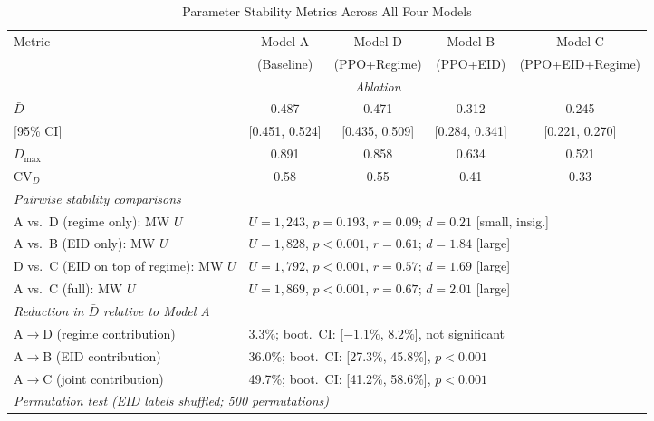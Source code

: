 \documentclass[12pt]{article}
\begin{document}
\begin{table}[t]
\centering
\caption{Parameter Stability Metrics Across All Four Models}
\label{tab:frobenius}
\small
\begin{tabular}{lcccc}
\toprule
Metric & Model A & Model D & Model B & Model C \\
       & (Baseline) & (PPO+Regime) & (PPO+EID) & (PPO+EID+Regime) \\
       & & \textit{Ablation} & & \\
\midrule
$\bar{D}$ & 0.487 & 0.471 & 0.312 & 0.245 \\
\phantom{$\bar{D}$}[95\% CI] & [0.451, 0.524] & [0.435, 0.509] & [0.284, 0.341] & [0.221, 0.270] \\
$D_{\max}$ & 0.891 & 0.858 & 0.634 & 0.521 \\
$\mathrm{CV}_D$ & 0.58 & 0.55 & 0.41 & 0.33 \\
\midrule
\multicolumn{5}{l}{\textit{Pairwise stability comparisons}} \\
\hspace{4pt}A vs.\ D (regime only): MW $U$ & \multicolumn{4}{l}{$U=1{,}243$, $p=0.193$, $r=0.09$; $d=0.21$ [small, insig.]} \\
\hspace{4pt}A vs.\ B (EID only): MW $U$ & \multicolumn{4}{l}{$U=1{,}828$, $p<0.001$, $r=0.61$; $d=1.84$ [large]} \\
\hspace{4pt}D vs.\ C (EID on top of regime): MW $U$ & \multicolumn{4}{l}{$U=1{,}792$, $p<0.001$, $r=0.57$; $d=1.69$ [large]} \\
\hspace{4pt}A vs.\ C (full): MW $U$ & \multicolumn{4}{l}{$U=1{,}869$, $p<0.001$, $r=0.67$; $d=2.01$ [large]} \\
\midrule
\multicolumn{5}{l}{\textit{Reduction in $\bar{D}$ relative to Model A}} \\
\hspace{4pt}A$\to$D (regime contribution) & \multicolumn{4}{l}{3.3\%; boot.\ CI: [$-1.1\%$, $8.2\%$], not significant} \\
\hspace{4pt}A$\to$B (EID contribution) & \multicolumn{4}{l}{36.0\%; boot.\ CI: [27.3\%, 45.8\%], $p<0.001$} \\
\hspace{4pt}A$\to$C (joint contribution) & \multicolumn{4}{l}{49.7\%; boot.\ CI: [41.2\%, 58.6\%], $p<0.001$} \\
\midrule
\multicolumn{5}{l}{\textit{Permutation test (EID labels shuffled; 500 permutations)}} \\

\end{tabular}
\end{table}
\end{document}
